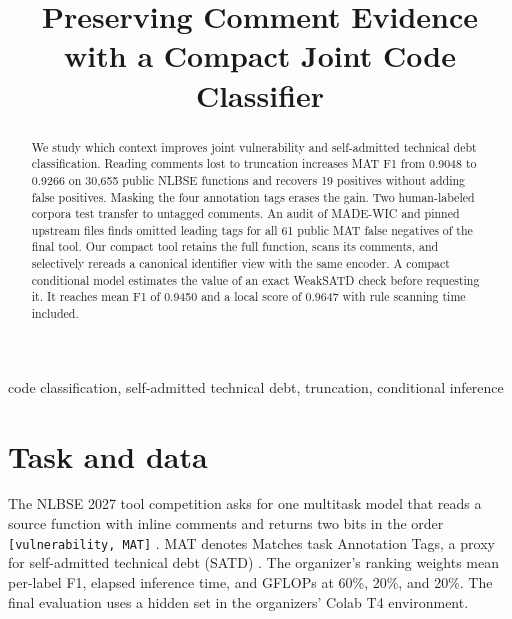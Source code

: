 \documentclass[10pt,conference]{IEEEtran}
\begin{document}
\title{Preserving Comment Evidence with a Compact Joint Code Classifier}
\author{
\and
{}}
\providecommand{\ArtifactURL}{\href{https://github.com/IlyaChekin/nlbse2027-comment-evidence/releases/tag/v1.0.1}{GitHub Release v1.0.1}}
\maketitle

\begin{abstract}
We study which context improves joint vulnerability and self-admitted technical debt classification. Reading comments lost to truncation increases MAT F1 from 0.9048 to 0.9266 on 30,655 public NLBSE functions and recovers 19 positives without adding false positives. Masking the four annotation tags erases the gain. Two human-labeled corpora test transfer to untagged comments. An audit of MADE-WIC and pinned upstream files finds omitted leading tags for all 61 public MAT false negatives of the final tool. Our compact tool retains the full function, scans its comments, and selectively rereads a canonical identifier view with the same encoder. A compact conditional model estimates the value of an exact WeakSATD check before
requesting it. It reaches mean F1 of 0.9450 and a local score of 0.9647 with
rule scanning time included.
\end{abstract}

\begin{IEEEkeywords}
code classification, self-admitted technical debt, truncation, conditional inference
\end{IEEEkeywords}

\section{Task and data}
The NLBSE 2027 tool competition asks for one multitask model that reads a source function with inline comments and returns two bits in the order \texttt{[vulnerability, MAT]} \cite{nlbse,rules,madewic,russo}. MAT denotes Matches task Annotation Tags, a proxy for self-admitted technical debt (SATD) \cite{russo}. The organizer's ranking weights mean per-label F1, elapsed inference time, and GFLOPs at 60\%, 20\%, and 20\%. The final evaluation uses a hidden set in the organizers' Colab T4 environment.
\end{document}

